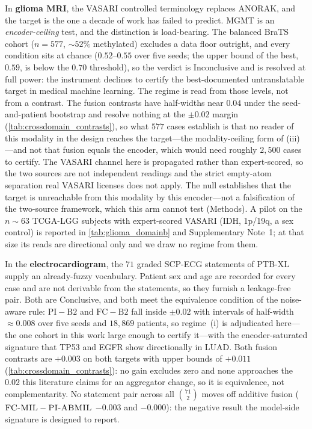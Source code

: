 In \textbf{glioma MRI}, the VASARI controlled
terminology\cite{gutman2013vasari} replaces ANORAK, and the target is
the one a decade of work has failed to predict. MGMT is an
\emph{encoder-ceiling} test, and the distinction is
load-bearing. The balanced BraTS cohort ($n\!=\!577$, ${\sim}52\%$
methylated) excludes a data floor outright, and every condition sits at
chance ($0.52$--$0.55$ over five seeds; the upper bound of the best,
$0.59$, is below the $0.70$ threshold), so the verdict is Inconclusive and is resolved at
full power: the instrument declines to certify the best-documented
untranslatable target in medical machine learning. The regime is read
from those levels, not from a contrast. The fusion contrasts have
half-widths near $0.04$ under the seed-and-patient bootstrap and resolve
nothing at the $\pm0.02$ margin
(\cref{tab:crossdomain_contrasts}), so what $577$ cases establish is that
no reader of this modality in the design reaches the target---the
modality-ceiling form of (iii)---and not that fusion equals the
encoder, which would need roughly $2{,}500$ cases to certify. The VASARI
channel here is propagated rather than expert-scored, so the two sources
are not independent readings and the strict empty-atom separation real
VASARI licenses does not apply. The null establishes that the target is
unreachable from this modality by this encoder---not a falsification of
the two-source framework, which this arm cannot test (Methods). A pilot on
the $n\!\sim\!63$ TCGA-LGG subjects with expert-scored VASARI (IDH,
1p/19q, a sex control) is reported in \cref{tab:glioma_domainb} and
Supplementary Note~1; at that size its reads are directional only and
we draw no regime from them.

In the \textbf{electrocardiogram}, the $71$ graded SCP-ECG statements of
PTB-XL\cite{wagner2020ptbxl} supply an already-fuzzy vocabulary.
Patient sex and age are recorded for every case and are not derivable
from the statements, so they furnish a leakage-free pair. Both are
Conclusive, and both meet the equivalence condition of the noise-aware
rule: $\mathrm{PI}-\mathrm{B2}$ and $\mathrm{FC}-\mathrm{B2}$ fall inside
$\pm0.02$ with intervals of half-width ${\approx}0.008$ over five seeds
and $18{,}869$
patients, so regime~(i) is adjudicated here---the one cohort in this
work large enough to certify it---with the encoder-saturated signature
that TP53 and EGFR show directionally in LUAD. Both fusion contrasts
are $+0.003$ on both targets with upper bounds of $+0.011$
(\cref{tab:crossdomain_contrasts}): no gain
excludes zero and none approaches the $0.02$ this literature claims for
an aggregator change, so it is equivalence, not complementarity. No
statement pair across all $\binom{71}{2}$ moves \fcmil{} off additive
fusion ($\textsc{FC-MIL}{}-\textsc{PI-ABMIL}{}$ $-0.003$ and $-0.000$): the negative
result the model-side signature is designed to report.

